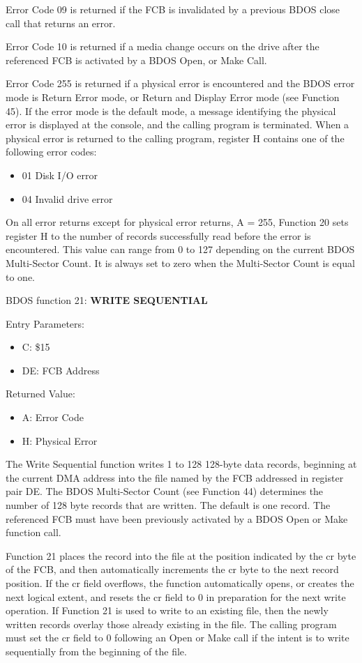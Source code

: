 Error Code 09 is returned if the FCB is invalidated by a previous BDOS
close call that returns an error.

Error Code 10 is returned if a media change occurs on the drive after
the referenced FCB is activated by a BDOS Open, or Make Call.

Error Code 255 is returned if a physical error is encountered and the
BDOS error mode is Return Error mode, or Return and Display Error mode
(see Function 45). If the error mode is the default mode, a message
identifying the physical error is displayed at the console, and the
calling program is terminated. When a physical error is returned to
the calling program, register H contains one of the following error
codes:

\begin{itemize}
\item 01 Disk I/O error
\item 04 Invalid drive error
\end{itemize}

On all error returns except for physical error returns, A = 255,
Function 20 sets register H to the number of records successfully read
before the error is encountered.  This value can range from 0 to 127
depending on the current BDOS Multi-Sector Count. It is always set to
zero when the Multi-Sector Count is equal to one.

BDOS function 21: \textbf{WRITE SEQUENTIAL}

Entry Parameters:
\begin{itemize}
\item[] C: \$15
\item[] DE: FCB Address
\end{itemize}

Returned Value:
\begin{itemize}
\item[] A: Error Code
\item[] H: Physical Error
\end{itemize}

The Write Sequential function writes 1 to 128 128-byte data records,
beginning at the current DMA address into the file named by the FCB
addressed in register pair DE. The BDOS Multi-Sector Count (see
Function 44) determines the number of 128 byte records that are
written. The default is one record. The referenced FCB must have been
previously activated by a BDOS Open or Make function call.

Function 21 places the record into the file at the position indicated
by the cr byte of the FCB, and then automatically increments the cr
byte to the next record position. If the cr field overflows, the
function automatically opens, or creates the next logical extent, and
resets the cr field to 0 in preparation for the next write operation.
If Function 21 is used to write to an existing file, then the newly
written records overlay those already existing in the file. The
calling program must set the cr field to 0 following an Open or Make
call if the intent is to write sequentially from the beginning of the
file.

